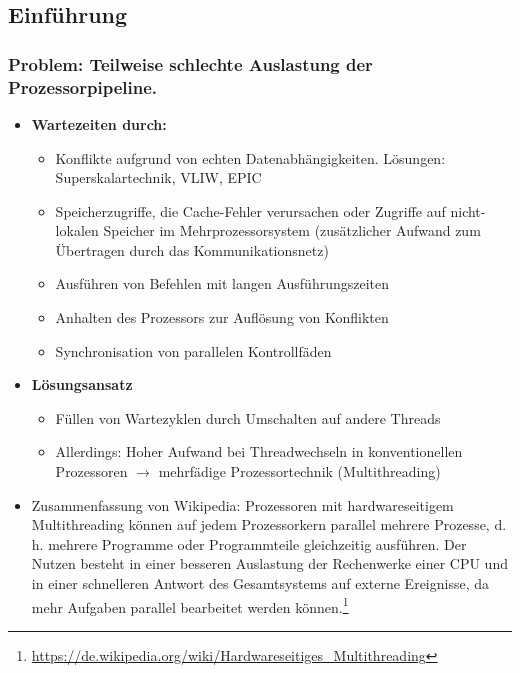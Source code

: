 \subsection{Einführung}

\subsubsection{Problem: Teilweise schlechte Auslastung der Prozessorpipeline.}
\begin{itemize}
	\item \textbf{Wartezeiten durch:}
	\begin{itemize}
		\item Konflikte aufgrund von echten Datenabhängigkeiten. Lösungen: Superskalartechnik, VLIW, EPIC
		\item Speicherzugriffe, die Cache-Fehler verursachen oder Zugriffe auf nicht-lokalen Speicher im Mehrprozessorsystem (zusätzlicher Aufwand zum Übertragen durch das Kommunikationsnetz)
		\item Ausführen von Befehlen mit langen Ausführungszeiten
		\item Anhalten des Prozessors zur Auflösung von Konflikten
		\item Synchronisation von parallelen Kontrollfäden
	\end{itemize}
	\item \textbf{Lösungsansatz}
	\begin{itemize}
		\item Füllen von Wartezyklen durch Umschalten auf andere Threads
		\item Allerdings: Hoher Aufwand bei Threadwechseln in konventionellen Prozessoren \(\rightarrow\) mehrfädige Prozessortechnik (Multithreading)
	\end{itemize}
	\item Zusammenfassung von Wikipedia: Prozessoren mit hardwareseitigem Multithreading können auf jedem Prozessorkern parallel mehrere Prozesse, d. h. mehrere Programme oder Programmteile gleichzeitig ausführen. Der Nutzen besteht in einer besseren Auslastung der Rechenwerke einer CPU und in einer schnelleren Antwort des Gesamtsystems auf externe Ereignisse, da mehr Aufgaben parallel bearbeitet werden können.\footnote{\url{https://de.wikipedia.org/wiki/Hardwareseitiges_Multithreading}}
\end{itemize}

